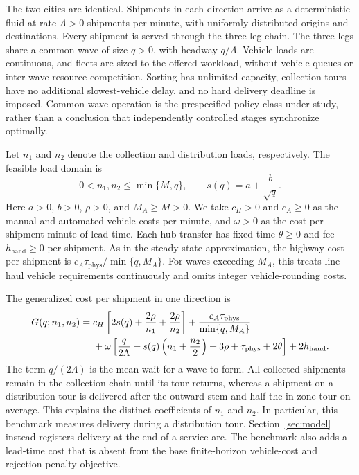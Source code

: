 \begin{assumption}
\label{ass:analysis-benchmark}
The two cities are identical. Shipments in each direction arrive as a
deterministic fluid at rate $\Lambda>0$ shipments per minute, with uniformly
distributed origins and destinations. Every shipment is served through the
three-leg chain. The three legs share a common wave of size $q>0$, with
headway $q/\Lambda$. Vehicle loads are continuous, and fleets are sized to
the offered workload, without vehicle queues or inter-wave resource
competition. Sorting has unlimited capacity, collection tours have no
additional slowest-vehicle delay, and no hard delivery deadline is imposed.
Common-wave operation is the prespecified policy class under study,
rather than a conclusion that independently controlled stages synchronize
optimally.
\end{assumption}

Let $n_1$ and $n_2$ denote the collection and distribution loads, respectively.
The feasible load domain is
\begin{equation}
 0<n_1,n_2\le\min\{M,q\},\qquad
 s(q)=a+\frac b{\sqrt q}.
 \label{eq:analysis-load-domain}
\end{equation}
Here $a>0$, $b>0$, $\rho>0$, and $M_A\ge M>0$. We take $c_H>0$ and
$c_A\ge0$ as the manual and automated vehicle costs per minute, and
$\omega>0$ as the cost per shipment-minute of lead time. Each hub transfer
has fixed time $\theta\ge0$ and fee $h_{\mathrm{hand}}\ge0$ per shipment.
As in the steady-state approximation, the highway cost per shipment is
$c_A\tau_{\mathrm{phys}}/\min\{q,M_A\}$. For waves exceeding $M_A$, this
treats line-haul vehicle requirements continuously and omits integer
vehicle-rounding costs.

The generalized cost per shipment in one direction is
\begin{align}
 G(q;n_1,n_2)={}&c_H\left[2s(q)+\frac{2\rho}{n_1}
                                      +\frac{2\rho}{n_2}\right]
 +\frac{c_A\tau_{\mathrm{phys}}}{\min\{q,M_A\}}
 \notag\\
 &+\omega\left[\frac q{2\Lambda}
       +s(q)\left(n_1+\frac{n_2}2\right)
       +3\rho+\tau_{\mathrm{phys}}+2\theta\right]
 +2h_{\mathrm{hand}}.
 \label{eq:analysis-generalized-cost}
\end{align}
The term $q/(2\Lambda)$ is the mean wait for a wave to form. All collected
shipments remain in the collection chain until its tour returns, whereas a
shipment on a distribution tour is delivered after the outward stem and half
the in-zone tour on average. This explains the distinct coefficients of
$n_1$ and $n_2$. In particular, this benchmark measures delivery during a
distribution tour. Section~\ref{sec:model} instead registers delivery at the
end of a service arc. The benchmark also adds a lead-time cost that is absent
from the base finite-horizon vehicle-cost and rejection-penalty objective.

